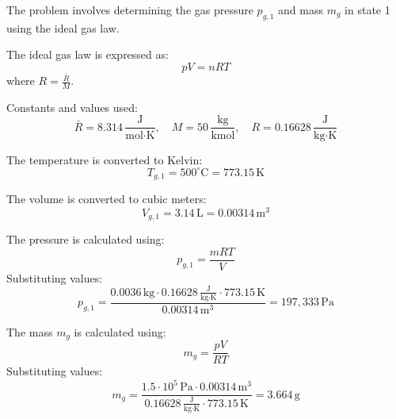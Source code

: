 The problem involves determining the gas pressure \( p_{g,1} \) and mass \( m_g \) in state 1 using the ideal gas law.  

The ideal gas law is expressed as:  
\[
pV = nRT
\]  
where \( R = \frac{\bar{R}}{M} \).  

Constants and values used:  
\[
\bar{R} = 8.314 \, \frac{\text{J}}{\text{mol·K}}, \quad M = 50 \, \frac{\text{kg}}{\text{kmol}}, \quad R = 0.16628 \, \frac{\text{J}}{\text{kg·K}}
\]  

The temperature is converted to Kelvin:  
\[
T_{g,1} = 500^\circ\text{C} = 773.15 \, \text{K}
\]  

The volume is converted to cubic meters:  
\[
V_{g,1} = 3.14 \, \text{L} = 0.00314 \, \text{m}^3
\]  

The pressure is calculated using:  
\[
p_{g,1} = \frac{mRT}{V}
\]  
Substituting values:  
\[
p_{g,1} = \frac{0.0036 \, \text{kg} \cdot 0.16628 \, \frac{\text{J}}{\text{kg·K}} \cdot 773.15 \, \text{K}}{0.00314 \, \text{m}^3} = 197,333 \, \text{Pa}
\]  

The mass \( m_g \) is calculated using:  
\[
m_g = \frac{pV}{RT}
\]  
Substituting values:  
\[
m_g = \frac{1.5 \cdot 10^5 \, \text{Pa} \cdot 0.00314 \, \text{m}^3}{0.16628 \, \frac{\text{J}}{\text{kg·K}} \cdot 773.15 \, \text{K}} = 3.664 \, \text{g}
\]